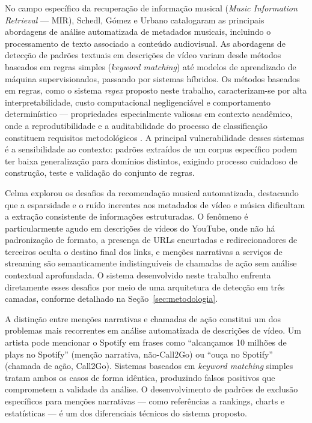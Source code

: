 \documentclass[12pt, a4paper]{article}
\begin{document}
No campo específico da recuperação de informação musical (\textit{Music Information Retrieval} --- MIR), Schedl, Gómez e Urbano \cite{schedl2014} catalogaram as principais abordagens de análise automatizada de metadados musicais, incluindo o processamento de texto associado a conteúdo audiovisual. As abordagens de detecção de padrões textuais em descrições de vídeo variam desde métodos baseados em regras simples (\textit{keyword matching}) até modelos de aprendizado de máquina supervisionados, passando por sistemas híbridos. Os métodos baseados em regras, como o sistema \textit{regex} proposto neste trabalho, caracterizam-se por alta interpretabilidade, custo computacional negligenciável e comportamento determinístico --- propriedades especialmente valiosas em contexto acadêmico, onde a reprodutibilidade e a auditabilidade do processo de classificação constituem requisitos metodológicos \cite{salganik2019}. A principal vulnerabilidade desses sistemas é a sensibilidade ao contexto: padrões extraídos de um corpus específico podem ter baixa generalização para domínios distintos, exigindo processo cuidadoso de construção, teste e validação do conjunto de regras.

Celma \cite{celma2010} explorou os desafios da recomendação musical automatizada, destacando que a esparsidade e o ruído inerentes aos metadados de vídeo e música dificultam a extração consistente de informações estruturadas. O fenômeno é particularmente agudo em descrições de vídeos do YouTube, onde não há padronização de formato, a presença de URLs encurtadas e redirecionadores de terceiros oculta o destino final dos links, e menções narrativas a serviços de streaming são semanticamente indistinguíveis de chamadas de ação sem análise contextual aprofundada. O sistema desenvolvido neste trabalho enfrenta diretamente esses desafios por meio de uma arquitetura de detecção em três camadas, conforme detalhado na Seção~\ref{sec:metodologia}.

A distinção entre menções narrativas e chamadas de ação constitui um dos problemas mais recorrentes em análise automatizada de descrições de vídeo. Um artista pode mencionar o Spotify em frases como ``alcançamos 10 milhões de plays no Spotify'' (menção narrativa, não-Call2Go) ou ``ouça no Spotify'' (chamada de ação, Call2Go). Sistemas baseados em \textit{keyword matching} simples tratam ambos os casos de forma idêntica, produzindo falsos positivos que comprometem a validade da análise. O desenvolvimento de padrões de exclusão específicos para menções narrativas --- como referências a rankings, charts e estatísticas --- é um dos diferenciais técnicos do sistema proposto.
\end{document}
